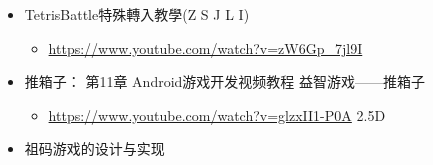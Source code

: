 \documentclass[9pt,b5paper]{article}
\begin{document}
\begin{itemize}
\item TetrisBattle特殊轉入教學(Z S J L I)
\begin{itemize}
\item \url{https://www.youtube.com/watch?v=zW6Gp_7jl9I}
\end{itemize}
\item 推箱子： 第11章 Android游戏开发视频教程 益智游戏——推箱子
\begin{itemize}
\item \url{https://www.youtube.com/watch?v=glzxII1-P0A} 2.5D
\end{itemize}
\item 祖码游戏的设计与实现
\end{itemize}
\end{document}
